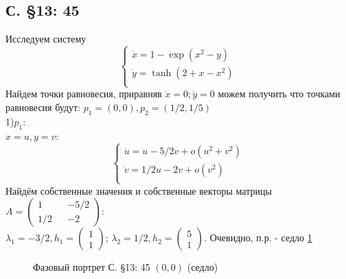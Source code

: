 \documentclass{article}
\begin{document}
\subsection{С. \S13: 45}
Исследуем систему 
\begin{equation}
\begin{cases}
        \dot{x}=1-\exp{(x^2-y)}\\
        \dot{y}=\tanh{(2+x-x^2)}\\
    \end{cases}    
\end{equation}
Найдем точки равновесия, приравняв $\dot{x}=0; \dot{y}=0$ можем получить что точками равновесия будут: $p_1=(0,0), p_2=(1/2,1/5)$\\

1)$p_1$:\\
$x=u,y=v$:
\begin{equation}
\begin{cases}
        \dot{u}=u-5/2v+o(u^2+v^2)\\
        \dot{v}=1/2u-2v+o(v^2)\\
    \end{cases}    
\end{equation}
Найдём собственные значения и собственные векторы матрицы $A=\begin{pmatrix} 1 && -5/2 \\ 1/2 && -2 \end{pmatrix}$:\\
 $\lambda_1=-3/2,
 h_1 = \begin{pmatrix} 1 \\  1 \end{pmatrix} $; 
 $\lambda_2= 1/2,
 h_2 = \begin{pmatrix} 5 \\  1 \end{pmatrix} $. 
 Очевидно, п.р. - седло \ref{13.45.1}
 \begin{figure}[ht]
\caption{Фазовый портрет С. \S13: 45 $(0,0)$ (седло)}
\label{13.45.1}
\end{figure}\\ 
\end{document}
